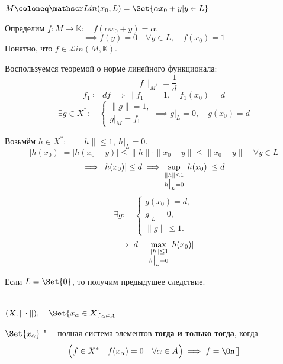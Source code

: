 \begin{eproof}
\item $ M \coloneq \mathscr Lin(x_0, L) = \Set{\alpha x_0 + y | y \in L} $

	Определим $ f : M \to \mathbb K : \quad f(\alpha x_0 + y) = \alpha $.
	$$ \implies f(y) = 0 \quad \forall y \in L, \quad f(x_0) = 1 $$
	Понятно, что $ f \in \mathscr Lin(M, \mathbb K) $.

	Воспользуемся теоремой о норме линейного функционала:
	$$ \|f\|_{M^*} = \frac1d $$
	$$ f_1 \coloneq df \implies \|f_1\| = 1, \quad f_1(x_0) = d $$
	$$ \exists g \in X^* : \quad
	\begin{cases}
		\|g\| = 1, \\
		g \bigr|_M = f_1
	\end{cases} \implies g \bigr|_L = 0, \quad g(x_0) = d $$
\item Возьмём $ h \in X^* : \quad \|h\| \le 1, ~ h \bigr|_L = 0 $.
	$$ |h(x_0)| = |h(x_0 - y)| \le \|h\| \cdot \|x_0 - y\| \le \|x_0 - y\| \quad \forall y \in L $$
	$$ \implies |h(x_0)| \le d \implies \sup\limits_{
		\begin{subarray}{c}
			\|h\| \le 1 \\
			h\bigr|_L = 0
		\end{subarray}}|h(x_0)| \le d $$
	$$ \exists g : \quad
	\begin{cases}
		g(x_0) = d, \\
		g \bigr|_L = 0, \\
		\|g\| \le 1.
	\end{cases} $$
	$$ \implies d = \max\limits_{
		\begin{subarray}{c}
			\|h\| \le 1 \\
			h\bigr|_L = 0
		\end{subarray}}|h(x_0)| $$
\end{eproof}

\begin{remark}
	Если $ L = \Set{0} $, то получим предыдущее следствие.
\end{remark}

\begin{implication}
	\hfill \\
	$ (X, \|\cdot\|), \quad \Set{x_\alpha \in X}_{\alpha \in A} $

	$ \Set{x_\alpha} $ "--- полная система элементов \textbf{тогда и только тогда}, когда
	$$ \Bigl( f \in X^* \quad f(x_\alpha) = 0 \quad \forall \alpha \in A \Bigr) \implies f = \On[] $$
\end{implication}

